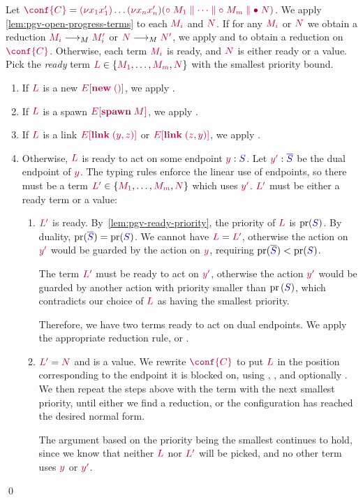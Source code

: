 \proof
\label{prf:thm-pgv-closed-progress-confs}
Let $\tm{\conf{C}}=\tm{\res{x_1}{x'_1}{\dots\res{x_n}{x'_n}{(\child\;M_1\parallel\dots\parallel\child\;M_m\parallel\main\;N)}}}$.
We apply \cref{lem:pgv-open-progress-terms} to each $\tm{M_i}$ and $\tm{N}$. If for any $\tm{M_i}$ or $\tm{N}$ we obtain a reduction $\tm{M_i}\tred\tm{M'_i}$ or $\tm{N}\tred\tm{N'}$, we apply  and  to obtain a reduction on $\tm{\conf{C}}$.
Otherwise, each term $\tm{M_i}$ is ready, and $\tm{N}$ is either ready or a value.
Pick the \emph{ready} term $\tm{L}\in\{\tm{M_1},\dots,\tm{M_m},\tm{N}\}$ with the smallest priority bound.
\begin{enumerate}
  \item
        If $\tm{L}$ is a new $\tm{\plug{E}{\new\;\unit}}$, we apply .
  \item
        If $\tm{L}$ is a spawn $\tm{\plug{E}{\spawn\;M}}$, we apply .
  \item
        If $\tm{L}$ is a link $\tm{\plug{E}{\link\;\pair{y}{z}}}$ or $\tm{\plug{E}{\link\;\pair{z}{y}}}$, we apply .
  \item
        Otherwise, $\tm{L}$ is ready to act on some endpoint $\tmty{y}{S}$. Let $\tmty{y'}{\co{S}}$ be the dual endpoint of $\tm{y}$. The typing rules enforce the linear use of endpoints, so there must be a term $\tm{L'}\in\{\tm{M_1},\dots,\tm{M_m},\tm{N}\}$ which uses $\tm{y'}$. $\tm{L'}$ must be either a ready term or a value:
        \begin{enumerate}
          \item
                $\tm{L'}$ is ready. By~\cref{lem:pgv-ready-priority}, the priority of $\tm{L}$ is $\pr(\ty{S})$. By duality, $\pr(\ty{\co{S}})=\pr(\ty{S})$.
                We cannot have $\tm{L}=\tm{L'}$, otherwise the action on $\tm{y'}$ would be guarded by the action on $\tm{y}$, requiring $\pr(\ty{\co{S}})<\pr(\ty{S})$.

                The term $\tm{L'}$ must be ready to act on $\tm{y'}$, otherwise the action $\tm{y'}$ would be guarded by another action with priority smaller than $\pr{(\ty{S})}$, which contradicts our choice of $\tm{L}$ as having the smallest priority.

                Therefore, we have two terms ready to act on dual endpoints. We apply the appropriate reduction rule, \ie {} or .
          \item
                $\tm{L'}=\tm{N}$ and is a value. We rewrite $\tm{\conf{C}}$ to put $\tm{L}$ in the position corresponding to the endpoint it is blocked on, using , , and optionally .
                We then repeat the steps above with the term with the next smallest priority, until either we find a reduction, or the configuration has reached the desired normal form.

                The argument based on the priority being the smallest continues to hold, since we know that neither $\tm{L}$ nor $\tm{L'}$ will be picked, and no other term uses $\tm{y}$ or $\tm{y'}$.
        \end{enumerate}
\end{enumerate}
\qed

